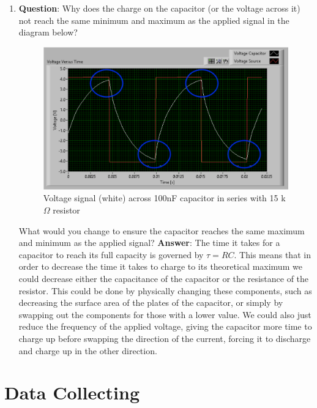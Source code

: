 \documentclass[12pt]{article}
\numberwithin{equation}{section}
\numberwithin{figure}{section}
\begin{document}
\begin{enumerate}
        \item \textbf{Question}: Why does the charge on the capacitor (or the voltage across it) not 
        reach the same minimum and maximum as the applied signal in the diagram below?
        \begin{figure}[H]
            \begin{center}
               \includegraphics[scale=.5]{Question5Diagram.png}
               \caption{Voltage signal (white) across 100nF capacitor in series with 15 k$\Omega$ resistor}
               \label{fig:Question5Diagram}
            \end{center}
        \end{figure}
        What would you change to ensure the capacitor reaches the same maximum and minimum as the 
        applied signal? \newline
        \textbf{Answer}: The time it takes for a capacitor to reach its full capacity is governed by 
        $\tau = RC$. This means that in order to decrease the time it takes to charge to its theoretical 
        maximum we could decrease either the capacitance of the capacitor or the resistance of the resistor. 
        This could be done by physically changing these components, such as decreasing the surface area of 
        the plates of the capacitor, or simply by swapping out the components for those with a lower value. 
        \newline
        We could also just reduce the frequency of the applied voltage, giving the capacitor more time to 
        charge up before swapping the direction of the current, forcing it to discharge and charge up in 
        the other direction.
    \end{enumerate}

    \section{Data Collecting}
\end{document}
